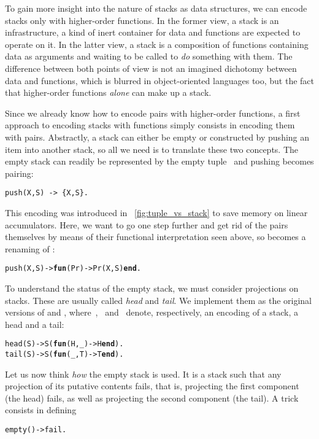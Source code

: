 To gain more insight into the nature of stacks as data structures, we
can encode stacks only with higher\hyp{}order functions. In the former
view, a stack is an infrastructure, a kind of inert container for data
and functions are expected to operate on it. In the latter view, a
stack is a composition of functions containing data as arguments and
waiting to be called to \emph{do} something with them. The difference
between both points of view is not an imagined dichotomy between data
and functions, which is blurred in object\hyp{}oriented languages too,
but the fact that higher\hyp{}order functions \emph{alone} can make up
a stack.

Since we already know how to encode pairs with higher\hyp{}order
functions, a first approach to encoding stacks with functions simply
consists in encoding them with pairs. Abstractly, a stack can either
be empty or constructed by pushing an item into another stack, so all
we need is to translate these two concepts. The empty stack can
readily be represented by the empty tuple~\erlcode{\{\}} and pushing
becomes pairing:
\begin{verbatim}
push(X,S) -> {X,S}.
\end{verbatim}
This encoding was introduced in \fig~\vref{fig:tuple_vs_stack} to save
memory on linear accumulators. Here, we want to go one step further
and get rid of the pairs themselves by means of their functional
interpretation seen above, so  becomes a renaming of
:
\begin{alltt}
push(X,S) -> \textbf{fun}(Pr) -> Pr(X,S) \textbf{end}.\hfill% \emph{See} mk_pair/2
\end{alltt}
To understand the status of the empty stack, we must consider
projections on stacks. These are usually called \emph{head} and
\emph{tail}. We implement them as the original versions of
 and , where~,
~and~ denote, respectively, an encoding of a
stack, a head and a tail:
\begin{alltt}
head(S) -> S(\textbf{fun}(H,\_) -> H \textbf{end}).\hfill% \emph{See} fst/2
tail(S) -> S(\textbf{fun}(\_,T) -> T \textbf{end}).\hfill% \emph{See} snd/2
\end{alltt}
Let us now think \emph{how} the empty stack is used. It is a stack
such that any projection of its putative contents fails, that is,
projecting the first component (the head) fails, as well as projecting
the second component (the tail). A trick consists in defining
\begin{alltt}
empty() -> fail.\hfill% \emph{The atom} fail \emph{is arbitrary}
\end{alltt}
